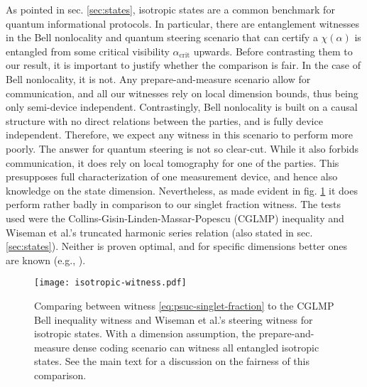         As pointed in sec. \ref{sec:states}, isotropic states are a common benchmark for quantum informational protocols. In particular, there are entanglement witnesses in the Bell nonlocality and quantum steering scenario that can certify a $\chi(\alpha)$ is entangled from some critical visibility $\alpha_{\text{crit}}$ upwards. Before contrasting them to our result, it is important to justify whether the comparison is fair. In the case of Bell nonlocality, it is not. Any prepare-and-measure scenario allow for communication, and all our witnesses rely on local dimension bounds, thus being only semi-device independent. Contrastingly, Bell nonlocality is built on a causal structure with no direct relations between the parties, and is fully device independent. Therefore, we expect any witness in this scenario to perform more poorly. The answer for quantum steering is not so clear-cut. While it also forbids communication, it does rely on local tomography for one of the parties. This presupposes full characterization of one measurement device, and hence also knowledge on the state dimension. Nevertheless, as made evident in fig. \ref{fig:isotropic-witness} it does perform rather badly in comparison to our singlet fraction witness. The tests used were the Collins-Gisin-Linden-Massar-Popescu (CGLMP) inequality \cite{collins_cglmp_2002} and Wiseman et al.'s truncated harmonic series relation \cite{wiseman_2007_steering} (also stated in sec. \ref{sec:states}). Neither is proven optimal, and for specific dimensions better ones are known (e.g., \cite{divianszky_qutritwitness_2017}).

        
        \begin{figure}
            \centering
            \texttt{[image: isotropic-witness.pdf]}
            \caption{Comparing between witness \ref{eq:psuc-singlet-fraction} to the CGLMP Bell inequality witness \cite{collins_cglmp_2002} and Wiseman et al.'s steering witness \cite{wiseman_2007_steering} for isotropic states. With a dimension assumption, the prepare-and-measure dense coding scenario can witness all entangled isotropic states. See the main text for a discussion on the fairness of this comparison.}
        \label{fig:isotropic-witness}
        \end{figure}
        
